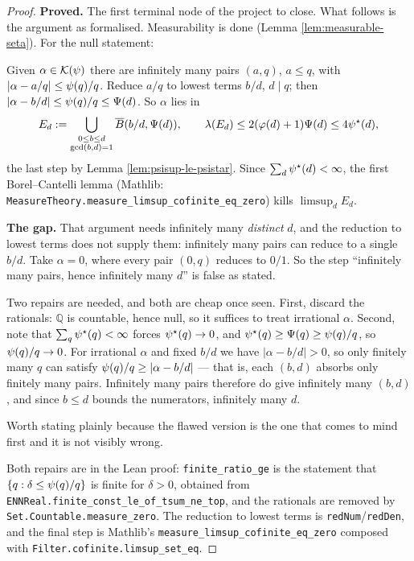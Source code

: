\begin{proof}
  \leanok
  \textbf{Proved.} The first terminal node of the project to close. What follows is the
  argument as formalised.
  Measurability is done (Lemma \ref{lem:measurable-seta}). For the null statement:

  Given $\alpha \in \mathcal{K}(\psi)$ there are infinitely many pairs $(a,q)$, $a \leq q$, with
  $|\alpha - a/q| \leq \psi(q)/q$. Reduce $a/q$ to lowest terms $b/d$, $d \mid q$; then
  $|\alpha - b/d| \leq \psi(q)/q \leq \Psi(d)$. So $\alpha$ lies in
  \[ E_d := \bigcup_{\substack{0 \le b \le d \\ \gcd(b,d)=1}} \overline{B}(b/d, \Psi(d)), \qquad
     \lambda(E_d) \leq 2(\varphi(d)+1)\Psi(d) \leq 4\psi^{\star}(d), \]
  the last step by Lemma \ref{lem:psisup-le-psistar}. Since $\sum_d \psi^{\star}(d) < \infty$,
  the first Borel--Cantelli lemma (Mathlib:
  \texttt{MeasureTheory.measure\_limsup\_cofinite\_eq\_zero}) kills $\limsup_d E_d$.

  \textbf{The gap.} That argument needs infinitely many \emph{distinct} $d$, and the
  reduction to lowest terms does not supply them: infinitely many pairs can reduce to a
  single $b/d$. Take $\alpha = 0$, where every pair $(0,q)$ reduces to $0/1$. So the
  step ``infinitely many pairs, hence infinitely many $d$'' is false as stated.

  Two repairs are needed, and both are cheap once seen. First, discard the rationals:
  $\mathbb{Q}$ is countable, hence null, so it suffices to treat irrational $\alpha$.
  Second, note that $\sum_q \psi^{\star}(q) < \infty$ forces $\psi^{\star}(q) \to 0$, and
  $\psi^{\star}(q) \geq \Psi(q) \geq \psi(q)/q$, so $\psi(q)/q \to 0$. For irrational $\alpha$
  and fixed $b/d$ we have $|\alpha - b/d| > 0$, so only finitely many $q$ can satisfy
  $\psi(q)/q \geq |\alpha - b/d|$ --- that is, each $(b,d)$ absorbs only finitely many
  pairs. Infinitely many pairs therefore do give infinitely many $(b,d)$, and since
  $b \leq d$ bounds the numerators, infinitely many $d$.

  Worth stating plainly because the flawed version is the one that comes to mind first
  and it is not visibly wrong.

  Both repairs are in the Lean proof: \texttt{finite\_ratio\_ge} is the statement that
  $\{q : \delta \le \psi(q)/q\}$ is finite for $\delta > 0$, obtained from
  \texttt{ENNReal.finite\_const\_le\_of\_tsum\_ne\_top}, and the rationals are removed by
  \texttt{Set.Countable.measure\_zero}. The reduction to lowest terms is
  \texttt{redNum}/\texttt{redDen}, and the final step is Mathlib's
  \texttt{measure\_limsup\_cofinite\_eq\_zero} composed with
  \texttt{Filter.cofinite.limsup\_set\_eq}.
\end{proof}

